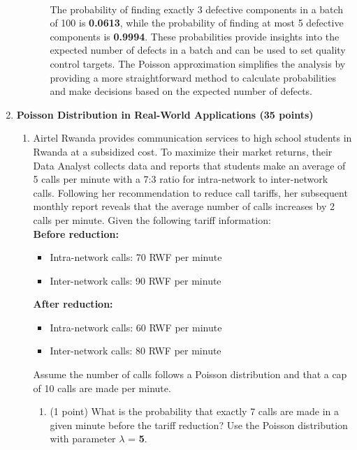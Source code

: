 \documentclass[a3paper,12pt]{article} %
\begin{document}
\begin{enumerate}
\begin{enumerate}
\begin{enumerate}
            \\ The probability of finding exactly 3 defective components in a batch of 100 is \textbf{0.0613}, while the probability of finding at most 5 defective components is \textbf{0.9994}. These probabilities provide insights into the expected number of defects in a batch and can be used to set quality control targets. The Poisson approximation simplifies the analysis by providing a more straightforward method to calculate probabilities and make decisions based on the expected number of defects.
        \end{enumerate}
    \end{enumerate}
    \newpage
    \item \textbf{Poisson Distribution in Real-World Applications (35 points)}
    \begin{enumerate}
        \item Airtel Rwanda provides communication services to high school students in Rwanda at a subsidized cost. To maximize their market returns, their Data Analyst collects data and reports that students make an
        average of 5 calls per minute with a 7:3 ratio for intra-network to inter-network calls. Following her
        recommendation to reduce call tariffs, her subsequent monthly report reveals that the average number
        of calls increases by 2 calls per minute.
        Given the following tariff information:
        \\ \textbf{Before reduction:}
        \begin{itemize}
            \item Intra-network calls: 70 RWF per minute
            \item Inter-network calls: 90 RWF per minute
        \end{itemize}
        \textbf{After reduction:}
        \begin{itemize}
            \item Intra-network calls: 60 RWF per minute
            \item Inter-network calls: 80 RWF per minute
        \end{itemize}
        Assume the number of calls follows a Poisson distribution and that a cap of 10 calls are made per minute.
        \begin{enumerate}
            \item (1 point) What is the probability that exactly 7 calls are made in a given minute before the tariff reduction? Use the Poisson distribution with parameter \(\lambda\) = \textbf{5}.

\end{enumerate}
\end{enumerate}
\end{enumerate}
\end{document}

